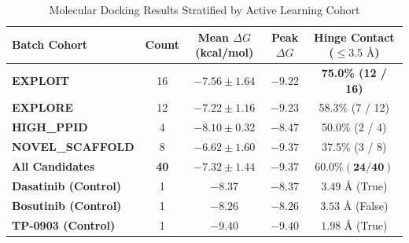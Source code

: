 \documentclass[journal]{IEEEtran}
\begin{document}
\begin{table}[!t]
\caption{Molecular Docking Results Stratified by Active Learning Cohort}
\label{tab:docking_breakdown}
\centering
\begin{tabular}{lcccc}
\toprule
\textbf{Batch Cohort} & \textbf{Count} & \textbf{Mean $\Delta G$ (kcal/mol)} & \textbf{Peak $\Delta G$} & \textbf{Hinge Contact ($\le 3.5\text{ \AA}$)} \\
\midrule
\textbf{EXPLOIT} & 16 & $-7.56 \pm 1.64$ & $-9.22$ & \textbf{75.0\% (12 / 16)} \\
\textbf{EXPLORE} & 12 & $-7.22 \pm 1.16$ & $-9.23$ & 58.3\% (7 / 12) \\
\textbf{HIGH\_PPID} & 4 & $-8.10 \pm 0.32$ & $-8.47$ & 50.0\% (2 / 4) \\
\textbf{NOVEL\_SCAFFOLD} & 8 & $-6.62 \pm 1.60$ & $-9.37$ & 37.5\% (3 / 8) \\
\midrule
\textbf{All Candidates} & \textbf{40} & $\mathbf{-7.32 \pm 1.44}$ & $\mathbf{-9.37}$ & $\mathbf{60.0\% (24 / 40)}$ \\
\midrule
\textbf{Dasatinib (Control)} & 1 & $-8.37$ & $-8.37$ & $3.49\text{ \AA}$ (True) \\
\textbf{Bosutinib (Control)} & 1 & $-8.26$ & $-8.26$ & $3.53\text{ \AA}$ (False) \\
\textbf{TP-0903 (Control)} & 1 & $-9.40$ & $-9.40$ & $1.98\text{ \AA}$ (True) \\
\bottomrule
\end{tabular}
\end{table}
\end{document}
